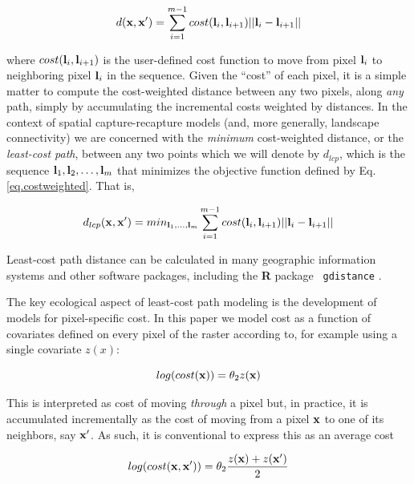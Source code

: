 \documentclass[12pt]{article}
\begin{document}
\begin{spacing}{1.8}
\begin{equation}
 d({\bf x},{\bf x}')
  =  \sum_{i=1}^{m-1} cost({\bf l}_{i},{\bf l}_{i+1})||{\bf l}_{i} - {\bf l}_{i+1}||
\label{eq.costweighted}
\end{equation}

{\flushleft
where } $cost({\bf l}_{i},{\bf l}_{i+1})$ is the user-defined cost function
to move
from pixel ${\bf l}_{i}$ to neighboring pixel ${\bf l}_{i}$ in the sequence.
Given the ``cost'' of each pixel, it is a simple matter to compute the
cost-weighted distance between any two pixels, along {\it any} path,
simply by accumulating the incremental  costs weighted by
distances.
In the context of
spatial capture-recapture models (and, more generally, landscape
connectivity) we are concerned with the {\it minimum} cost-weighted
distance, or the {\it least-cost path}, between any two points which
we will denote by $d_{lcp}$, which is
the
sequence ${\bf l}_{1},{\bf l}_{2},\ldots,{\bf l}_{m}$ that minimizes
the objective function defined by Eq. \ref{eq.costweighted}. That is,

\begin{equation}
 d_{lcp}({\bf x},{\bf x}')
  =  min_{{\bf l}_{1},\ldots,{\bf l}_{m}}  \sum_{i=1}^{m-1} cost({\bf l}_{i},{\bf l}_{i+1})||{\bf l}_{i} - {\bf l}_{i+1}||
\label{eq.lcp}
\end{equation}

{\flushleft
 Least-cost} path distance can be calculated in
 many geographic information systems and other software packages,
including the {\bf R} package \mbox{\tt
  gdistance} \citep{vanetten:2011}.


The key ecological aspect of least-cost path modeling is the
development 
of models for pixel-specific cost. 
In this paper we model cost as a function of covariates
defined on every pixel of the raster according to, for example using a
single covariate $z(x)$:

\begin{equation}
 log(cost({\bf x}))=  \theta_{2} z({\bf x})
\label{eq.cost}
\end{equation}

{\flushleft This} is interpreted as cost of moving {\it through} a
pixel but, in practice, it is accumulated incrementally as the cost of
moving from a pixel ${\bf x}$ to one of its neighbors, say ${\bf
  x}'$. As such, it is conventional to express this as an average cost

\[
 log(cost({\bf x},{\bf x}'))=  \theta_{2} \frac{z({\bf x})+z({\bf x}')}{2}
\]


\end{spacing}
\end{document}

